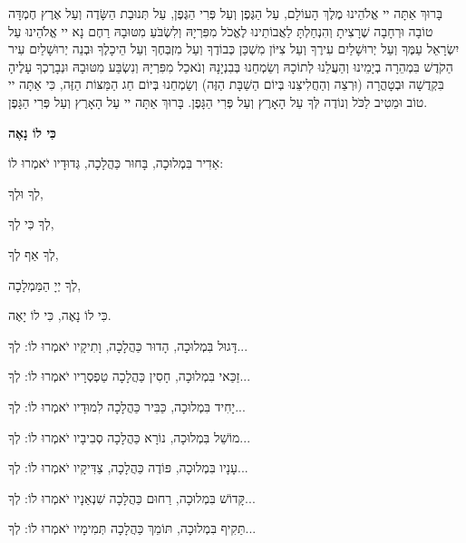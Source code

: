בָּרוּךְ אַתָּה יי אֱלֹהֵינוּ מֶלֶךְ הָעוֹלָם, עַל הַגֶּפֶן וְעַל פְּרִי הַגֶּפֶן, עַל תְּנוּבַת הַשָּׂדֶה וְעַל אֶרֶץ חֶמְדָּה טוֹבָה וּרְחָבָה שֶׁרָצִיתָ וְהִנְחַלְתָּ לַאֲבוֹתֵינוּ לֶאֱכֹל מִפִּרְיָהּ וְלִשְׂבֹּעַ מִטּוּבָהּ רַחֶם נָא יי אֱלֹהֵינוּ עַל יִשְׂרָאֵל עַמֶּךָ וְעַל יְרוּשָׁלַיִם עִירֶךָ וְעַל צִיּוֹן מִשְׁכַּן כְּבוֹדֶךָ וְעַל מִזְבְּחֶךָ וְעַל הֵיכָלֶךָ וּבְנֵה יְרוּשָׁלַיִם עִיר הַקֹדֶשׁ בִּמְהֵרָה בְיָמֵינוּ וְהַעֲלֵנוּ לְתוֹכָהּ וְשַׂמְחֵנוּ בְּבִנְיָנָהּ וְנֹאכַל מִפִּרְיָהּ וְנִשְׂבַּע מִטּוּבָהּ וּנְבָרֶכְךָ עָלֶיהָ בִּקְדֻשָׁה וּבְטָהֳרָה (וּרְצֵה וְהַחֲלִיצֵנוּ בְּיוֹם הַשַׁבָּת הַזֶּה) וְשַׂמְחֵנוּ בְּיוֹם חַג הַמַּצּוֹת הַזֶּה, כִּי אַתָּה יי טוֹב וּמֵטִיב לַכֹּל וְנוֹדֶה לְּךָ עַל הָאָרֶץ וְעַל פְּרִי הַגָּפֶן. בָּרוּךְ אַתָּה יי עַל הָאָרֶץ וְעַל פְּרִי הַגָּפֶן.


\setlength{\parindent}{0em}

\begin{center}
{\large \bfseries
כִּי לוֹ נָאֶה
}

אַדִיר בִּמְלוּכָה, בָּחוּר כַּהֲלָכָה, גְּדוּדָיו יֹאמְרוּ לוֹ: 

\vspace{0.5em}

לְךָ וּלְךָ, 

לְךָ כִּי לְךָ, 

לְךָ אַף לְךָ, 

לְךָ יְיָ הַמַּמְלָכָה, 

כִּי לוֹ נָאֶה, כִּי לוֹ יָאֶה.

\vspace{0.5em}

דָּגוּל בִּמְלוּכָה, הָדוּר כַּהֲלָכָה, וָתִיקָיו יֹאמְרוּ לוֹ: 
\hfill
לְךָ...

זַכַּאי בִּמְלוּכָה, חָסִין כַּהֲלָכָה טַפְסְרָיו יֹאמְרוּ לוֹ: 
\hfill
לְךָ...

יָחִיד בִּמְלוּכָה, כַּבִּיר כַּהֲלָכָה לִמוּדָיו יֹאמְרוּ לוֹ: 
\hfill
לְךָ...

מוֹשֵׁל בִּמְלוּכָה, נוֹרָא כַּהֲלָכָה סְבִיבָיו יֹאמְרוּ לוֹ: 
\hfill
לְךָ...

עָנָיו בִּמְלוּכָה, פּוֹדֶה כַּהֲלָכָה, צַדִּיקָיו יֹאמְרוּ לוֹ: 
\hfill
לְךָ...

קָּדוֹשׁ בִּמְלוּכָה, רַחוּם כַּהֲלָכָה שִׁנְאַנָיו יֹאמְרוּ לוֹ: 
\hfill
לְךָ...

תַּקִיף בִּמְלוּכָה, תּוֹמֵךְ כַּהֲלָכָה תְּמִימָיו יֹאמְרוּ לוֹ: 
\hfill
לְךָ...
\end{center}
\break

